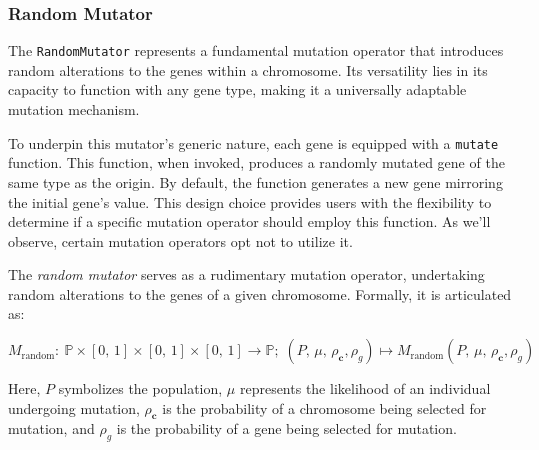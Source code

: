 \subsubsection{Random Mutator}
\label{sec:keen:op:mut:simple}

  The \texttt{RandomMutator} represents a fundamental mutation operator that
  introduces random alterations to the genes within a chromosome. Its versatility 
  lies in its capacity to function with any gene type, making it a universally 
  adaptable mutation mechanism.

  To underpin this mutator's generic nature, each gene is equipped with a
  \texttt{mutate} function. This function, when invoked, produces a randomly 
  mutated gene of the same type as the origin. By default, the function generates 
  a new gene mirroring the initial gene's value. This design choice provides 
  users with the flexibility to determine if a specific mutation operator should 
  employ this function. As we'll observe, certain mutation operators opt not to 
  utilize it.

  \begin{definition}
    The \emph{random mutator} serves as a rudimentary mutation operator, 
    undertaking random alterations to the genes of a given chromosome. 
    Formally, it is articulated as:

    \begin{equation}
      M_\mathrm{random} :\: \mathbb{P} \times [0,\, 1] \times [0,\, 1] 
        \times [0,\, 1] \to \mathbb{P};\;
      (P,\, \mu,\, \rho_\textbf{c}, \rho_g) 
        \mapsto M_\mathrm{random}(P,\, \mu,\, \rho_\textbf{c}, \rho_g)
    \end{equation}

    Here, \(P\) symbolizes the population, \(\mu\) represents the likelihood of 
    an individual undergoing mutation, \(\rho_\textbf{c}\) is the probability
    of a chromosome being selected for mutation, and \(\rho_g\) is the
    probability of a gene being selected for mutation.
  \end{definition}


